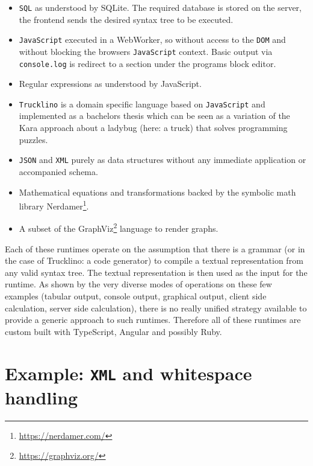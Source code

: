 \documentclass[sigconf,natbib=false]{acmart}
\begin{document}
\begin{itemize}
\item \texttt{SQL} as understood by SQLite. The required database is stored on the server, the frontend sends the desired syntax tree to be executed.

\item \texttt{JavaScript} executed in a WebWorker, so without access to the \texttt{DOM} and without blocking the browsers \texttt{JavaScript} context. Basic output via \texttt{console.log} is redirect to a section under the programs block editor.

\item Regular expressions as understood by JavaScript.

\item \texttt{Trucklino} is a domain specific language based on \texttt{Java\-Script} and implemented as a bachelors thesis \cite{popp_konzeption_2019} which can be seen as a variation of the Kara approach\cite{hartmann_kara_2001} about a ladybug (here: a truck) that solves programming puzzles.

\item \texttt{JSON} and \texttt{XML} purely as data structures without any immediate application or accompanied schema.

\item Mathematical equations and transformations backed by the symbolic math library Nerdamer\footnote{\url{https://nerdamer.com/}}.

\item A subset of the GraphViz\footnote{\url{https://graphviz.org/}} language to render graphs.
\end{itemize}

Each of these runtimes operate on the assumption that there is a grammar (or in the case of Trucklino: a code generator) to compile a textual representation from any valid syntax tree. The textual representation is then used as the input for the runtime. As shown by the very diverse modes of operations on these few examples (tabular output, console output, graphical output, client side calculation, server side calculation), there is no really unified strategy available to provide a generic approach to such runtimes. Therefore all of these runtimes are custom built with TypeScript, Angular and possibly Ruby.

\section{Example: \texttt{XML} and whitespace handling}
\end{document}
